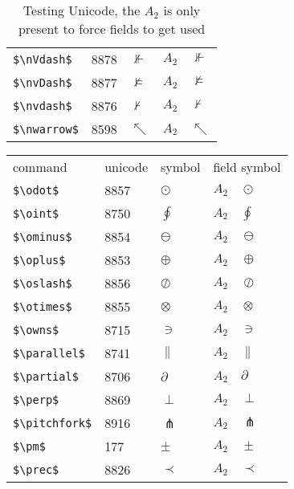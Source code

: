 \documentclass{article}
\begin{document}
\begin{table}
\begin{center}
\begin{tabular}{llll}
 \verb#$\nVdash$#             & 8878 & $\nVdash$             & $A_2\quad \nVdash$\\
 \verb#$\nvDash$#             & 8877 & $\nvDash$             & $A_2\quad \nvDash$\\
 \verb#$\nvdash$#             & 8876 & $\nvdash$             & $A_2\quad \nvdash$\\
 \verb#$\nwarrow$#            & 8598 & $\nwarrow$            & $A_2\quad \nwarrow$\\
\end{tabular}
\end{center}
\caption{Testing Unicode, the $A_2$ is only present to force fields to get used}
\end{table}

\begin{table}
\begin{center}
\begin{tabular}{llll}
 command                    &unicode & symbol                & field symbol\\
 \verb#$\odot$#               & 8857 & $\odot$               & $A_2\quad \odot$\\
 \verb#$\oint$#               & 8750 & $\oint$               & $A_2\quad \oint$\\
 \verb#$\ominus$#             & 8854 & $\ominus$             & $A_2\quad \ominus$\\
 \verb#$\oplus$#              & 8853 & $\oplus$              & $A_2\quad \oplus$\\
 \verb#$\oslash$#             & 8856 & $\oslash$             & $A_2\quad \oslash$\\
 \verb#$\otimes$#             & 8855 & $\otimes$             & $A_2\quad \otimes$\\
 \verb#$\owns$#               & 8715 & $\owns$               & $A_2\quad \owns$\\
 \verb#$\parallel$#           & 8741 & $\parallel$           & $A_2\quad \parallel$\\
 \verb#$\partial$#            & 8706 & $\partial$            & $A_2\quad \partial$\\
 \verb#$\perp$#               & 8869 & $\perp$               & $A_2\quad \perp$\\
 \verb#$\pitchfork$#          & 8916 & $\pitchfork$          & $A_2\quad \pitchfork$\\
 \verb#$\pm$#                  & 177 & $\pm$                 & $A_2\quad \pm$\\
 \verb#$\prec$#               & 8826 & $\prec$               & $A_2\quad \prec$\\

\end{tabular}
\end{center}
\end{table}
\end{document}
